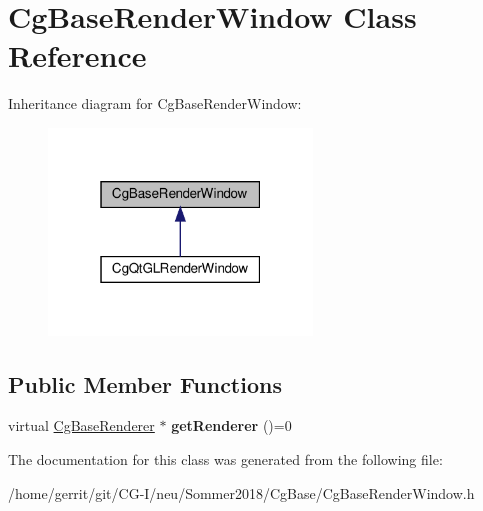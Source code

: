 \hypertarget{class_cg_base_render_window}{}\section{Cg\+Base\+Render\+Window Class Reference}
\label{class_cg_base_render_window}


Inheritance diagram for Cg\+Base\+Render\+Window\+:
\nopagebreak
\begin{figure}[H]
\begin{center}
\leavevmode
\includegraphics[width=199pt]{class_cg_base_render_window__inherit__graph}
\end{center}
\end{figure}
\subsection*{Public Member Functions}
\begin{DoxyCompactItemize}
\item 
\mbox{\label{class_cg_base_render_window_ae7ff04d5ed346b3aa3ce0d6ef5d71aa2}} 
virtual \hyperlink{class_cg_base_renderer}{Cg\+Base\+Renderer} $\ast$ {\bfseries get\+Renderer} ()=0
\end{DoxyCompactItemize}


The documentation for this class was generated from the following file\+:\begin{DoxyCompactItemize}
\item 
/home/gerrit/git/\+C\+G-\/\+I/neu/\+Sommer2018/\+Cg\+Base/Cg\+Base\+Render\+Window.\+h\end{DoxyCompactItemize}
